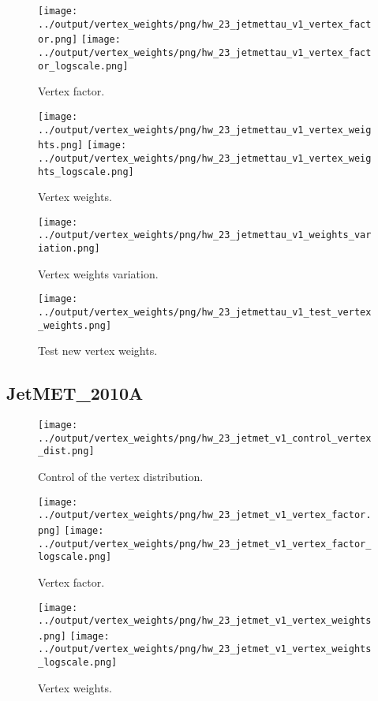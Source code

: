 \documentclass[11pt]{book}
\begin{document}
\begin{figure}[ht]
\centering
\texttt{[image: ../output/vertex\_weights/png/hw\_23\_jetmettau\_v1\_vertex\_factor.png]}
\texttt{[image: ../output/vertex\_weights/png/hw\_23\_jetmettau\_v1\_vertex\_factor\_logscale.png]}
\caption{Vertex factor.}
\end{figure}

\begin{figure}[ht]
\centering
\texttt{[image: ../output/vertex\_weights/png/hw\_23\_jetmettau\_v1\_vertex\_weights.png]}
\texttt{[image: ../output/vertex\_weights/png/hw\_23\_jetmettau\_v1\_vertex\_weights\_logscale.png]}
\caption{Vertex weights.}
\end{figure}

\begin{figure}[ht]
\centering
\texttt{[image: ../output/vertex\_weights/png/hw\_23\_jetmettau\_v1\_weights\_variation.png]}
\caption{Vertex weights variation.}
\end{figure}

\begin{figure}[ht]
\centering
\texttt{[image: ../output/vertex\_weights/png/hw\_23\_jetmettau\_v1\_test\_vertex\_weights.png]}
\caption{Test new vertex weights.}
\end{figure}
\clearpage

\subsection{JetMET\_2010A}
\begin{figure}[ht]
\centering
\texttt{[image: ../output/vertex\_weights/png/hw\_23\_jetmet\_v1\_control\_vertex\_dist.png]}
\caption{Control of the vertex distribution.}
\end{figure}

\begin{figure}[ht]
\centering
\texttt{[image: ../output/vertex\_weights/png/hw\_23\_jetmet\_v1\_vertex\_factor.png]}
\texttt{[image: ../output/vertex\_weights/png/hw\_23\_jetmet\_v1\_vertex\_factor\_logscale.png]}
\caption{Vertex factor.}
\end{figure}

\begin{figure}[ht]
\centering
\texttt{[image: ../output/vertex\_weights/png/hw\_23\_jetmet\_v1\_vertex\_weights.png]}
\texttt{[image: ../output/vertex\_weights/png/hw\_23\_jetmet\_v1\_vertex\_weights\_logscale.png]}
\caption{Vertex weights.}
\end{figure}
\end{document}
